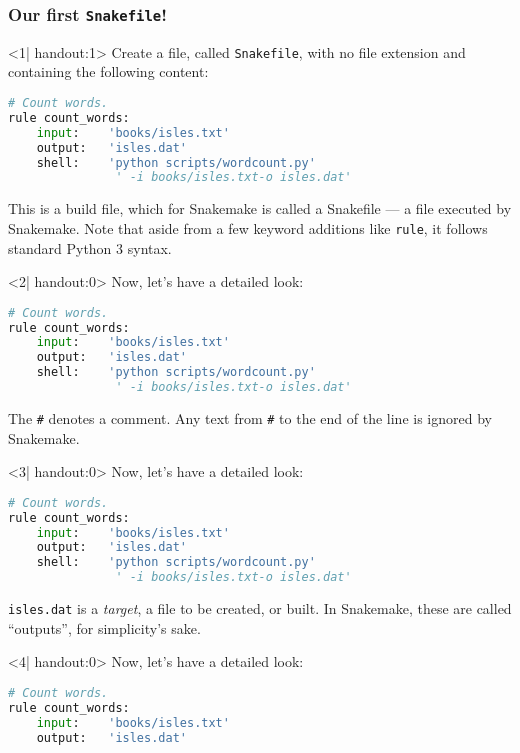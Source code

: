 \begin{frame}[fragile]
  \frametitle{Our first \texttt{Snakefile}!}
  \begin{onlyenv}<1| handout:1>
    Create a file, called \texttt{Snakefile}, with no file extension and containing the following content:
    \begin{lstlisting}[language=Python,style=Python]
# Count words.
rule count_words:
    input:    'books/isles.txt'
    output:   'isles.dat'
    shell:    'python scripts/wordcount.py' 
               ' -i books/isles.txt-o isles.dat'
    \end{lstlisting}

  This is a build file, which for Snakemake is called a Snakefile — a file executed by Snakemake. Note that aside from a few keyword additions like \texttt{rule}, it follows standard Python 3 syntax.
    \end{onlyenv}
  \begin{onlyenv}<2| handout:0>
   Now, let's have a detailed look:
   \begin{lstlisting}[language=Python,style=Python]
# Count words.
rule count_words:
    input:    'books/isles.txt'
    output:   'isles.dat'
    shell:    'python scripts/wordcount.py' 
               ' -i books/isles.txt-o isles.dat'
    \end{lstlisting}
    The \texttt{\#} denotes a comment. Any text from \texttt{\#} to the end of the line is ignored by Snakemake.
  \end{onlyenv}
  \begin{onlyenv}<3| handout:0>
   Now, let's have a detailed look:
   \begin{lstlisting}[language=Python,style=Python]
# Count words.
rule count_words:
    input:    'books/isles.txt'
    output:   'isles.dat'
    shell:    'python scripts/wordcount.py' 
               ' -i books/isles.txt-o isles.dat'
    \end{lstlisting}
    \texttt{isles.dat} is a \emph{target}, a file to be created, or built. In Snakemake, these are called “outputs”, for simplicity’s sake.
  \end{onlyenv}
  \begin{onlyenv}<4| handout:0>
   Now, let's have a detailed look:
   \begin{lstlisting}[language=Python,style=Python]
# Count words.
rule count_words:
    input:    'books/isles.txt'
    output:   'isles.dat'

\end{lstlisting}
\end{onlyenv}
\end{frame}
